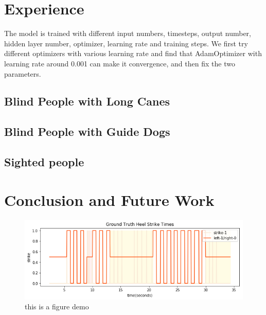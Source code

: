 \documentclass[11pt]{article}
\begin{document}
\section{Experience}
The model is trained with different input numbers, timesteps, output number, hidden layer number, optimizer, learning rate and training steps. We first try different optimizers with various learning rate and find that AdamOptimizer with learning rate around 0.001 can make it convergence, and then fix the two parameters.

\subsection{Blind People with Long Canes}
\subsection{Blind People with Guide Dogs}
\subsection{Sighted people}


\section{Conclusion and Future Work}

\begin{figure}[ht]
\centering
\includegraphics[scale=0.6]{ground_truth_3.png}
\caption{this is a figure demo}
\label{fig:pathdemo4}
\end{figure}




%
%
\end{document}
